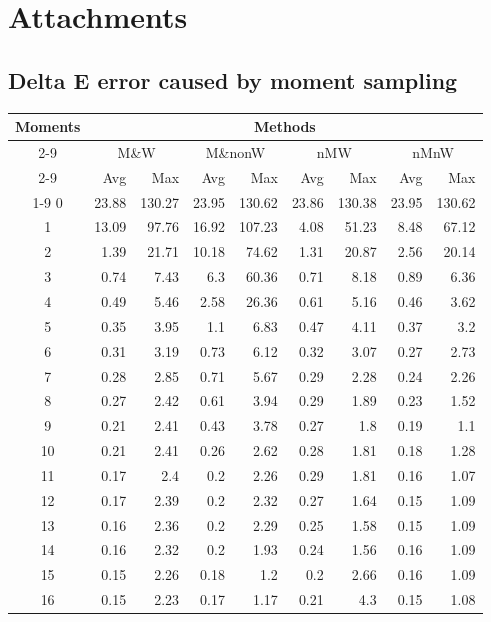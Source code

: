 \chapter{Attachments}

\section{Delta E error caused by moment sampling} \label{sec:completeMomentError}

	\begin{longtable}{crrrrrrrr}
		\hline
		
		\multirow{4}{*}{Moments} & 
		\multicolumn{8}{c}{Methods} \\
		\cmidrule(lr){2-9}
		&\multicolumn{2}{c}{M\&W} &
		\multicolumn{2}{c}{M\&nonW} &
		\multicolumn{2}{c}{nMW} &
		\multicolumn{2}{c}{nMnW}\\
		\cmidrule(lr){2-9}
		& Avg & Max & Avg & Max & Avg & Max & Avg & Max \\
		\cmidrule(lr){1-9}
		0&23.88&130.27&23.95&130.62&23.86&130.38&23.95&130.62\\
		1&13.09&97.76&16.92&107.23&4.08&51.23&8.48&67.12\\
		2&1.39&21.71&10.18&74.62&1.31&20.87&2.56&20.14\\
		3&0.74&7.43&6.3&60.36&0.71&8.18&0.89&6.36\\
		4&0.49&5.46&2.58&26.36&0.61&5.16&0.46&3.62\\
		5&0.35&3.95&1.1&6.83&0.47&4.11&0.37&3.2\\
		6&0.31&3.19&0.73&6.12&0.32&3.07&0.27&2.73\\
		7&0.28&2.85&0.71&5.67&0.29&2.28&0.24&2.26\\
		8&0.27&2.42&0.61&3.94&0.29&1.89&0.23&1.52\\
		9&0.21&2.41&0.43&3.78&0.27&1.8&0.19&1.1\\
		10&0.21&2.41&0.26&2.62&0.28&1.81&0.18&1.28\\
		11&0.17&2.4&0.2&2.26&0.29&1.81&0.16&1.07\\
		12&0.17&2.39&0.2&2.32&0.27&1.64&0.15&1.09\\
		13&0.16&2.36&0.2&2.29&0.25&1.58&0.15&1.09\\
		14&0.16&2.32&0.2&1.93&0.24&1.56&0.16&1.09\\
		15&0.15&2.26&0.18&1.2&0.2&2.66&0.16&1.09\\
		16&0.15&2.23&0.17&1.17&0.21&4.3&0.15&1.08\\

\end{longtable}
